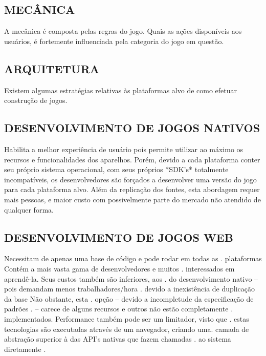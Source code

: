 \documentclass[11pt,a4paper]{article}
\begin{document}
\subsection{MECÂNICA}

A mecânica é composta pelas regras do jogo. Quais as ações
disponíveis aos usuários, é fortemente influenciada pela categoria do
jogo em questão.

\subsection{ARQUITETURA}

Existem algumas estratégias relativas às plataformas alvo de como
efetuar construção de jogos.

\subsection{DESENVOLVIMENTO DE JOGOS NATIVOS}

Habilita a melhor experiência de usuário pois permite utilizar ao
máximo os recursos e funcionalidades dos aparelhos. Porém, devido
a cada plataforma conter seu próprio sistema operacional, com seus
próprios *SDK's* totalmente incompatíveis, os desenvolvedores são
forçados a desenvolver uma versão do jogo para cada plataforma alvo.
Além da replicação dos fontes, esta abordagem requer mais pessoas, e
maior custo com possivelmente parte do mercado não atendido de qualquer
forma.

\subsection{DESENVOLVIMENTO DE JOGOS WEB}

Necessitam de apenas uma base de código e pode rodar em todas as      .
plataformas Contém a mais vasta gama de desenvolvedores e muitos      .
interessados em aprendê-la. Seus custos também são inferiores, aos  .
do desenvolvimento nativo – pois demandam menos trabalhadores/hora   .
devido a inexistência de duplicação da base Não obstante, esta     .
opção – devido a incompletude da especificação de padrões       .
– carece de alguns recursos e outros não estão completamente       .
implementados. Performance também pode ser um limitador, visto que    .
estas tecnologias são executadas através de um navegador, criando uma.
camada de abstração superior à das API's nativas que fazem chamadas .
ao sistema diretamente                                                 .
\end{document}
